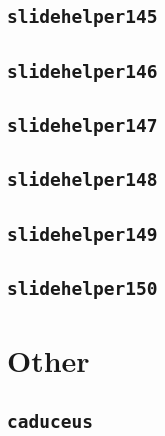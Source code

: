 \subsection{\texttt{slidehelper145}}
\newpage
\subsection{\texttt{slidehelper146}}
\newpage
\subsection{\texttt{slidehelper147}}
\newpage
\subsection{\texttt{slidehelper148}}
\newpage
\subsection{\texttt{slidehelper149}}
\newpage
\subsection{\texttt{slidehelper150}}

\newpage

\section{Other}

\subsection{\texttt{caduceus}}




